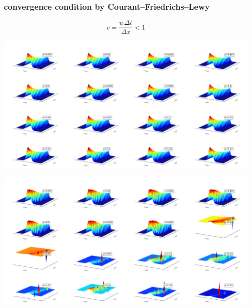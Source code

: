 \begin{frame}
  \frametitle{convergence condition by Courant–Friedrichs–Lewy}
  \Huge{
  $$ c = \frac{u \, \Delta t}{\Delta x} < 1  $$
}
\end{frame}

\begin{frame}
  \includegraphics[width=\linewidth]{../BurgersEquation/images/multi_stable.pdf}\\
\end{frame}

\begin{frame}
  \includegraphics[width=\linewidth]{../BurgersEquation/images/multi_unstable.pdf}\\
\end{frame}


